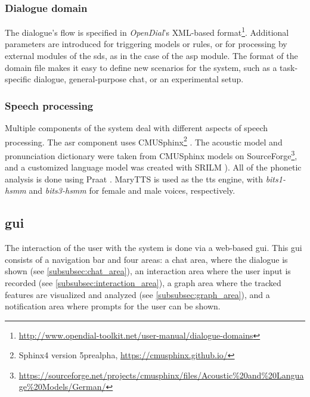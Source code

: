 \subsubsection{Dialogue domain}
\label{subsubsec:dialogue_domain}

The dialogue's flow is specified in \emph{OpenDial}'s \citep{Lison2015developing} XML-based format\footnote{\url{http://www.opendial-toolkit.net/user-manual/dialogue-domains}}.
Additional parameters are introduced for triggering models or rules, or for processing by external modules of the \ac{sds}, as in the case of the \ac{asp} module.
The format of the domain file makes it easy to define new scenarios for the system,
such as a task-specific dialogue, general-purpose chat, or an experimental setup.

\subsubsection{Speech processing}
\label{subsubsec:speech_processing}

Multiple components of the system deal with different aspects of speech processing.
The \ac{asr} component uses CMUSphinx\footnote{Sphinx4 version 5prealpha, \url{https://cmusphinx.github.io/}} \citep{Lamere2003sphinx}.
The acoustic model and pronunciation dictionary were taken from CMUSphinx models on SourceForge\footnote{\url{https://sourceforge.net/projects/cmusphinx/files/Acoustic\%20and\%20Language\%20Models/German/}}, and a customized language model was created with SRILM \citep{Stolcke2002SRILM}).
All of the phonetic analysis is done using Praat \citep{Boersma2018praat}.
MaryTTS \citep{LeMaguer2017uprooted} is used as the \ac{tts} engine, with \emph{bits1-hsmm} and \emph{bits3-hsmm} for female and male voices, respectively.

\subsection{\Acl{gui}}
\label{subsec:graphical_user_interface}

The interaction of the user with the system is done via a web-based \ac{gui}.
This \ac{gui} consists of a navigation bar and four areas:
a chat area, where the dialogue is shown (see \cref{subsubsec:chat_area}),
an interaction area where the user input is recorded (see \cref{subsubsec:interaction_area}),
a graph area where the tracked features are visualized and analyzed (see \cref{subsubsec:graph_area}),
and a notification area where prompts for the user can be shown.

